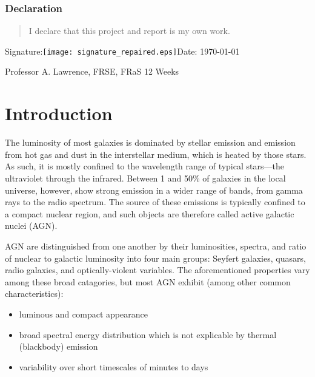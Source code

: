 \documentclass[a4paper,11pt]{article}
\begin{document}
\vspace*{1cm}

\subsubsection*{Declaration}
\begin{quotation}
    I declare that this project and report is my own work.
\end{quotation}

\hspace*{1cm}Signature:\hspace*{1cm}\texttt{[image: signature\_repaired.eps]}\hspace*{1cm}Date: \today

\vfill
{} Professor A. Lawrence, FRSE, FRaS
\hfill
12 Weeks

\newpage
\setcounter{page}{1} %
\tableofcontents
\newpage

\section{Introduction}

The luminosity of most galaxies is dominated by stellar emission and emission
from hot gas and dust in the interstellar medium, which is heated by those
stars. As such, it is mostly confined to the wavelength range of typical
stars---the ultraviolet through the infrared. Between 1 and 50\% of galaxies in
the local universe, however, show strong emission in a wider range of bands,
from gamma rays to the radio spectrum. The source of these emissions is
typically confined to a compact nuclear region, and such objects are therefore
called active galactic nuclei (AGN).\cite{mcclure_2019}

AGN are distinguished from one another by their luminosities, spectra, and
ratio of nuclear to galactic luminosity into four main groups: Seyfert galaxies,
quasars, radio galaxies, and optically-violent variables. The aforementioned
properties vary among these broad catagories, but most AGN exhibit (among other
common characteristics):

\begin{itemize}
    \item luminous and compact appearance
    \item broad spectral energy distribution which is not explicable by thermal
    (blackbody) emission
    \item variability over short timescales of minutes to days
\end{itemize}
\end{document}
